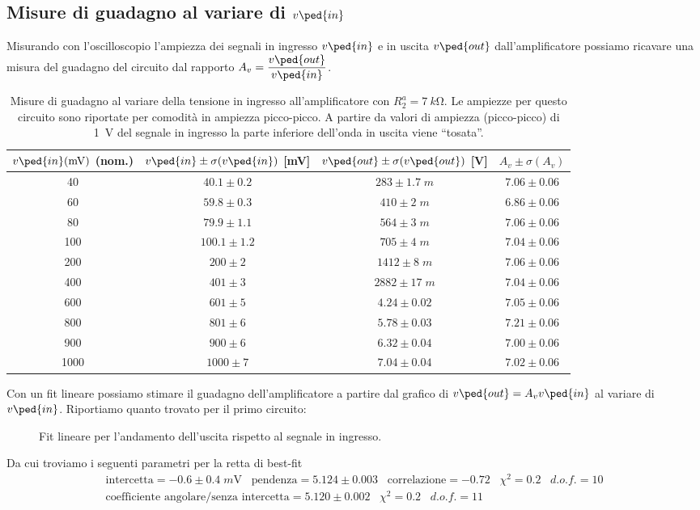 \documentclass[10pt,a4paper]{article}
\begin{document}
\setcounter{subsection}{3}
\subsection{Misure di guadagno al variare di $v\ped{in}$}
Misurando con l'oscilloscopio l'ampiezza dei segnali in ingresso $v\ped{in}$
e in uscita $v\ped{out}$ dall'amplificatore possiamo ricavare una misura del
guadagno del circuito dal rapporto $A_v = \dfrac{v\ped{out}}{v\ped{in}}$.

\begin{table}[htbp]
\centering
\begin{tabular}{cccc}
\toprule
$v\ped{in}(\si{m\V})$ (nom.) & $v\ped{in} \pm \sigma(v\ped{in})$ [mV] & 
$v\ped{out} \pm \sigma(v\ped{out})$ [V] & $A_v \pm \sigma(A_v)$ \\
\midrule
\midrule
40 & $40.1 \pm 0.2$ & $283 \pm 1.7 \; \si{m}$ & $7.06 \pm 0.06$ \\
60 & $59.8 \pm 0.3$ & $410 \pm 2 \; \si{m}$ & $6.86 \pm 0.06$ \\
80 & $79.9 \pm 1.1$ & $564 \pm 3 \; \si{m}$ & $7.06 \pm 0.06$ \\
100 & $100.1 \pm 1.2$ & $705 \pm 4 \; \si{m}$ & $7.04 \pm 0.06$ \\
200 & $200 \pm 2$ & $1412 \pm 8 \; \si{m}$ & $7.06 \pm 0.06$ \\
400 & $401 \pm 3$ & $2882 \pm 17 \; \si{m}$ & $7.04 \pm 0.06$ \\
600 & $601 \pm 5$ & $4.24 \pm 0.02$ & $7.05 \pm 0.06$ \\
800 & $801 \pm 6$ & $5.78 \pm 0.03$ & $7.21 \pm 0.06$ \\
900 & $900 \pm 6$ & $6.32 \pm 0.04$ & $7.00 \pm 0.06$ \\
1000 & $1000 \pm 7$ & $7.04 \pm 0.04$ & $7.02 \pm 0.06$ \\
\bottomrule
\end{tabular} 
\caption{Misure di guadagno al variare della tensione in ingresso
all'amplificatore con $R_2^a = \SI{7}{k\ohm}$. Le ampiezze per questo
circuito sono riportate per comodità in ampiezza picco-picco. A partire
da valori di ampiezza (picco-picco) di \SI{1}{\V} del segnale in ingresso la
parte inferiore dell'onda in uscita viene ``tosata''. \label{tab: gain_M}}
\end{table}

Con un fit lineare possiamo stimare il guadagno dell'amplificatore a partire
dal grafico di $v\ped{out} = A_v v\ped{in}$ al variare di $v\ped{in}$.
Riportiamo quanto trovato per il primo circuito:
\begin{figure}[htbp]
\centering
\caption{Fit lineare per l'andamento dell'uscita rispetto al segnale in
ingresso. \label{fig: gainfit}}
\end{figure}
Da cui troviamo i seguenti parametri per la retta di best-fit
\begin{align*}
\mathrm{intercetta} = -0.6 \pm 0.4 \; \si{m\V} \;\;\;\mathrm{pendenza} = 5.124 
\pm 0.003 \;\;\;\mathrm{correlazione} 
= -0.72 \;\;\; \chi^2 = 0.2 \;\;\; d.o.f. = 10 \\
\text{coefficiente angolare/senza intercetta} = 5.120 \pm 0.002 \;\;\;
\chi^2 = 0.2 \;\;\; d.o.f. = 11
\end{align*}
\end{document}
